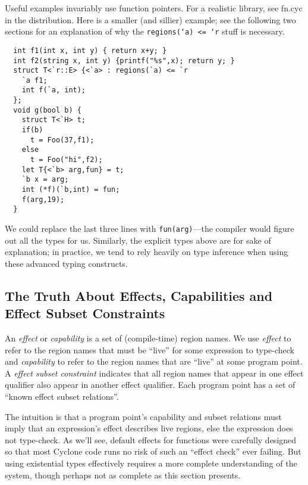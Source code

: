 Useful examples invariably use function pointers.  For a realistic
library, see fn.cyc in the distribution.  Here is a smaller (and
sillier) example; see the following two sections for an
explanation of why the \texttt{regions(`a) <= `r} stuff is necessary.
\begin{verbatim}
  int f1(int x, int y) { return x+y; }
  int f2(string x, int y) {printf("%s",x); return y; }
  struct T<`r::E> {<`a> : regions(`a) <= `r 
    `a f1; 
    int f(`a, int); 
  };
  void g(bool b) {
    struct T<`H> t;
    if(b)
      t = Foo(37,f1);
    else
      t = Foo("hi",f2);
    let T{<`b> arg,fun} = t;
    `b x = arg;
    int (*f)(`b,int) = fun;
    f(arg,19);
  }
\end{verbatim}

We could replace the last three lines with \texttt{fun(arg)}---the
compiler would figure out all the types for us.  Similarly, the
explicit types above are for sake of explanation; in practice, we tend
to rely heavily on type inference when using these advanced typing
constructs.

\subsection{The Truth About Effects, Capabilities and Effect Subset Constraints}

An \emph{effect} or \emph{capability} is a set of (compile-time)
region names.  We use \emph{effect} to refer to the region names that
must be ``live'' for some expression to type-check and
\emph{capability} to refer to the region names that are ``live'' at
some program point.  A \emph{effect subset constraint} indicates that
all region names that appear in one effect qualifier also appear in
another effect qualifier. Each program point has a set of ``known
effect subset relations''.

The intuition is that a program point's capability and subset
relations must imply that an expression's effect describes live
regions, else the expression does not type-check.  As we'll see,
default effects for functions were carefully designed so that most
Cyclone code runs no risk of such an ``effect check'' ever failing.
But using existential types effectively requires a more complete
understanding of the system, though perhaps not as complete as this
section presents.

